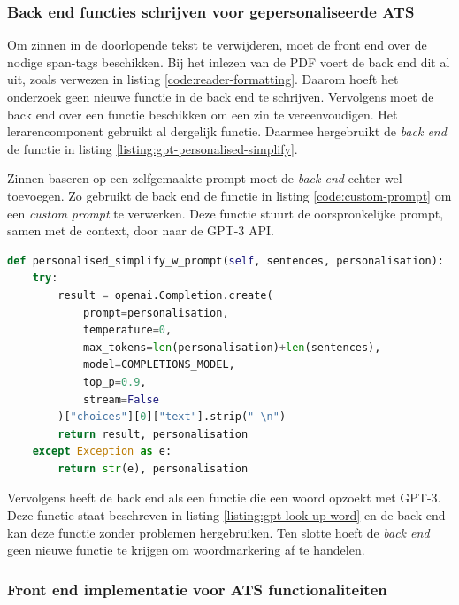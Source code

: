\subsubsection{Back end functies schrijven voor gepersonaliseerde ATS}

Om zinnen in de doorlopende tekst te verwijderen, moet de front end over de nodige span-tags beschikken. Bij het inlezen van de PDF voert de back end dit al uit, zoals verwezen in listing \ref{code:reader-formatting}. Daarom hoeft het onderzoek geen nieuwe functie in de back end te schrijven. Vervolgens moet de back end over een functie beschikken om een zin te vereenvoudigen. Het lerarencomponent gebruikt al dergelijk functie. Daarmee hergebruikt de \textit{back end} de functie in listing \ref{listing:gpt-personalised-simplify}. 

\medspace

Zinnen baseren op een zelfgemaakte prompt moet de \textit{back end} echter wel toevoegen. Zo gebruikt de back end de functie in listing \ref{code:custom-prompt} om een \textit{custom prompt} te verwerken. Deze functie stuurt de oorspronkelijke prompt, samen met de context, door naar de GPT-3 API.

\begin{lstlisting}[language=python, caption={Een API-call sturen naar GPT-3 met een custom prompt.}, label={code:custom-prompt}]
def personalised_simplify_w_prompt(self, sentences, personalisation):
	try:
		result = openai.Completion.create(
			prompt=personalisation,
			temperature=0,
			max_tokens=len(personalisation)+len(sentences),
			model=COMPLETIONS_MODEL,
			top_p=0.9,
			stream=False
		)["choices"][0]["text"].strip(" \n")
		return result, personalisation
	except Exception as e:
		return str(e), personalisation
\end{lstlisting}


Vervolgens heeft de back end als een functie die een woord opzoekt met GPT-3. Deze functie staat beschreven in listing \ref{listing:gpt-look-up-word} en de back end kan deze functie zonder problemen hergebruiken. Ten slotte hoeft de \textit{back end} geen nieuwe functie te krijgen om woordmarkering af te handelen.

\subsubsection{Front end implementatie voor ATS functionaliteiten}


